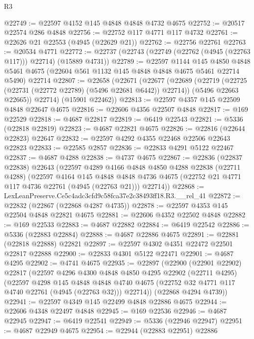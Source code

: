 \begin{lexlean}{R3}
\begin{coremodule}
@22749 := @22597 @4152 @145 @4848 @4848 @4732 @4675
@22752 := @20517 @22574 @286 @4848
@22756 := @22752 @117 @4771 @117 @4732
@22761 := @22626 @21 @22553 (@4945 (@22629 @21))
@22762 := @22756 @22761
@22763 := @20534 @4771
@22772 := @22737 (@22743 (@22749 (@22762 (@4945 (@22763 @117))) @22714) (@15889 @4731))
@22789 := @22597
    @1144
    @145
    @4850
    @4848
    @5461
    @4675
    (@22604 @561 @1132 @145 @4848 @4848 @4675 @5461 @22714 @5490)
    @22714
@22807 := @22658
    (@22671
      (@22677
        (@22689
          (@22719 (@22725 (@22731 (@22772 @22789) (@5496 @22681 @6442)) @22714))
          (@5496 @22663 @22665))
        @22714)
      (@15901 @22462))
@22813 := @22597 @4357 @145 @22509 @4848 @22647 @4675
@22816 := @22606 @4356 @22507 @4848
@22817 := @169 @22529
@22818 := @4687 @22817
@22819 := @6419 @22543
@22821 := @5336 (@22818 @22819)
@22823 := @4687 @22821 @4675
@22826 := @22816 (@22644 @22823) @22647
@22832 := @22597 @4292 @4355 @22468 @22506 @22643 @22823
@22833 := @22585 @2857
@22836 := @22833 @4291 @5122 @22467
@22837 := @4687 @4288
@22838 := @4737 @4675
@22867 := @22836
    (@22837 @22838)
    @22643
    (@22597
      @4289
      @4166
      @4848
      @4850
      @4288
      @22838
      (@22711 @4288)
      (@22597
        @4164
        @145
        @4848
        @4848
        @4736
        @4675
        (@22752 @21 @4771 @117 @4736 @22761 (@4945 (@22763 @21)))
        @22714))
@22868 := LexLeanPreserve.Ce5c4adc3cfd9c58fca37e2c38493ff18.R3.__rel_41
@22872 := @22832 (@22867 (@22868 @4287 @4735))
@22878 := @22597 @4353 @145 @22504 @4848 @22821 @4675
@22881 := @22606 @4352 @22502 @4848
@22882 := @169 @22533
@22883 := @4687 @22882
@22884 := @6419 @22542
@22886 := @5336 (@22883 @22884)
@22888 := @4687 @22886 @4675
@22891 := @22881 (@22818 @22888) @22821
@22897 := @22597 @4302 @4351 @22472 @22501 @22817 @22888
@22900 := @22833 @4301 @5122 @22471
@22901 := @4687 @4295
@22902 := @4741 @4675
@22935 := @22897
    (@22900
      (@22901 @22902)
      @22817
      (@22597
        @4296
        @4300
        @4848
        @4850
        @4295
        @22902
        (@22711 @4295)
        (@22597
          @4298
          @145
          @4848
          @4848
          @4740
          @4675
          (@22752 @32 @4771 @117 @4740 @22761 (@4945 (@22763 @32)))
          @22714))
      (@22868 @4294 @4739))
@22941 := @22597 @4349 @145 @22499 @4848 @22886 @4675
@22944 := @22606 @4348 @22497 @4848
@22945 := @169 @22536
@22946 := @4687 @22945
@22947 := @6419 @22541
@22949 := @5336 (@22946 @22947)
@22951 := @4687 @22949 @4675
@22954 := @22944 (@22883 @22951) @22886

\end{coremodule}
\end{lexlean}

